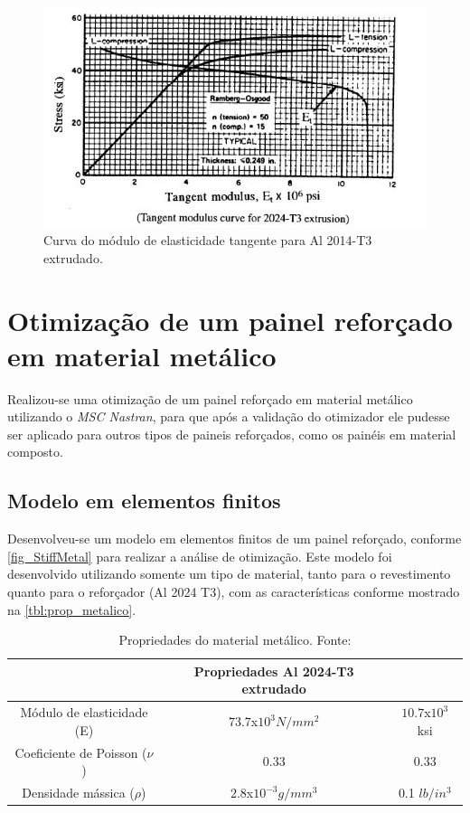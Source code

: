 {\begin{figure}[ht]
	\caption{\label{fig_tangentmodulus}Curva do módulo de elasticidade tangente para Al 2014-T3 extrudado.}
  \centering
  \includegraphics[scale=1.0]{figura/TangentModulus}
\end{figure}

\section{Otimização de um painel reforçado em material metálico}
Realizou-se uma otimização de um painel reforçado em material metálico utilizando o \emph{MSC Nastran}, para que após a validação do otimizador ele pudesse ser aplicado para outros tipos de paineis reforçados, como os painéis em material composto.

\subsection{Modelo em elementos finitos}
Desenvolveu-se um modelo em elementos finitos de um painel reforçado, conforme \autoref{fig_StiffMetal} para realizar a análise de otimização. Este modelo foi desenvolvido utilizando somente um tipo de material, tanto para o revestimento quanto para o reforçador (Al 2024 T3), com as características conforme mostrado na \autoref{tbl:prop_metalico}.

\begin{table}[h]
\centering
\begin{tabular}{ccc}
\toprule
& Propriedades Al 2024-T3 extrudado \\ \midrule
Módulo de elasticidade (E) & $73.7$x$10^3N/mm^2$ & $10.7$x$10^3$ ksi \\
Coeficiente de Poisson ($\nu$) & 0.33 & 0.33\\
Densidade mássica ($\rho$)  & $2.8$x$10^{-3} g/mm^3$ & 0.1 $lb/in^3$ \\
\bottomrule
\end{tabular}
\caption{Propriedades do material metálico. Fonte:\cite{rice2003metallic}}
\label{tbl:prop_metalico}
\end{table}

}
